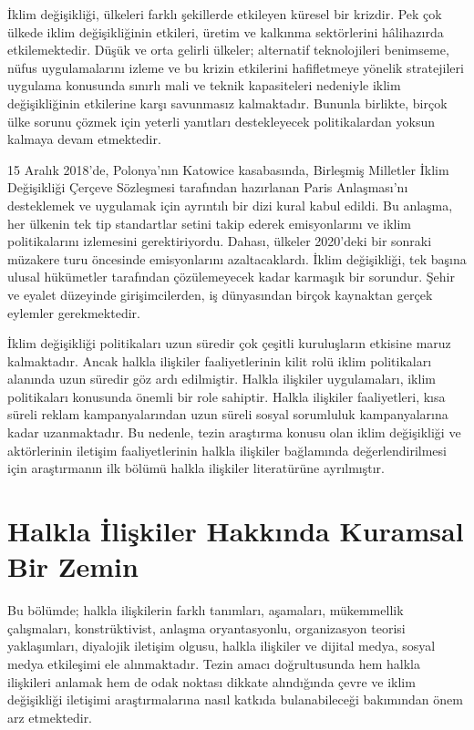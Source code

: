 \documentclass[
]{book}
\begin{document}
İklim değişikliği, ülkeleri farklı şekillerde etkileyen küresel bir krizdir. Pek çok ülkede iklim değişikliğinin etkileri, üretim ve kalkınma sektörlerini hâlihazırda etkilemektedir. Düşük ve orta gelirli ülkeler; alternatif teknolojileri benimseme, nüfus uygulamalarını izleme ve bu krizin etkilerini hafifletmeye yönelik stratejileri uygulama konusunda sınırlı mali ve teknik kapasiteleri nedeniyle iklim değişikliğinin etkilerine karşı savunmasız kalmaktadır. Bununla birlikte, birçok ülke sorunu çözmek için yeterli yanıtları destekleyecek politikalardan yoksun kalmaya devam etmektedir. \citep{glasgow2018public}

15 Aralık 2018'de, Polonya'nın Katowice kasabasında, Birleşmiş Milletler İklim Değişikliği Çerçeve Sözleşmesi tarafından hazırlanan Paris Anlaşması'nı desteklemek ve uygulamak için ayrıntılı bir dizi kural kabul edildi. Bu anlaşma, her ülkenin tek tip standartlar setini takip ederek emisyonlarını ve iklim politikalarını izlemesini gerektiriyordu. Dahası, ülkeler 2020'deki bir sonraki müzakere turu öncesinde emisyonlarını azaltacaklardı. İklim değişikliği, tek başına ulusal hükümetler tarafından çözülemeyecek kadar karmaşık bir sorundur. Şehir ve eyalet düzeyinde girişimcilerden, iş dünyasından birçok kaynaktan gerçek eylemler gerekmektedir. \citep{dhanda2019climate}

İklim değişikliği politikaları uzun süredir çok çeşitli kuruluşların etkisine maruz kalmaktadır. Ancak halkla ilişkiler faaliyetlerinin kilit rolü iklim politikaları alanında uzun süredir göz ardı edilmiştir. Halkla ilişkiler uygulamaları, iklim politikaları konusunda önemli bir role sahiptir. Halkla ilişkiler faaliyetleri, kısa süreli reklam kampanyalarından uzun süreli sosyal sorumluluk kampanyalarına kadar uzanmaktadır.\citep{brulle2021role} Bu nedenle, tezin araştırma konusu olan iklim değişikliği ve aktörlerinin iletişim faaliyetlerinin halkla ilişkiler bağlamında değerlendirilmesi için araştırmanın ilk bölümü halkla ilişkiler literatürüne ayrılmıştır.

\hypertarget{halkla-iliux15fkiler-hakkux131nda-kuramsal-bir-zemin}{%
\section{Halkla İlişkiler Hakkında Kuramsal Bir Zemin}\label{halkla-iliux15fkiler-hakkux131nda-kuramsal-bir-zemin}}

Bu bölümde; halkla ilişkilerin farklı tanımları, aşamaları, mükemmellik çalışmaları, konstrüktivist, anlaşma oryantasyonlu, organizasyon teorisi yaklaşımları, diyalojik iletişim olgusu, halkla ilişkiler ve dijital medya, sosyal medya etkileşimi ele alınmaktadır. Tezin amacı doğrultusunda hem halkla ilişkileri anlamak hem de odak noktası dikkate alındığında çevre ve iklim değişikliği iletişimi araştırmalarına nasıl katkıda bulanabileceği bakımından önem arz etmektedir.
\end{document}
